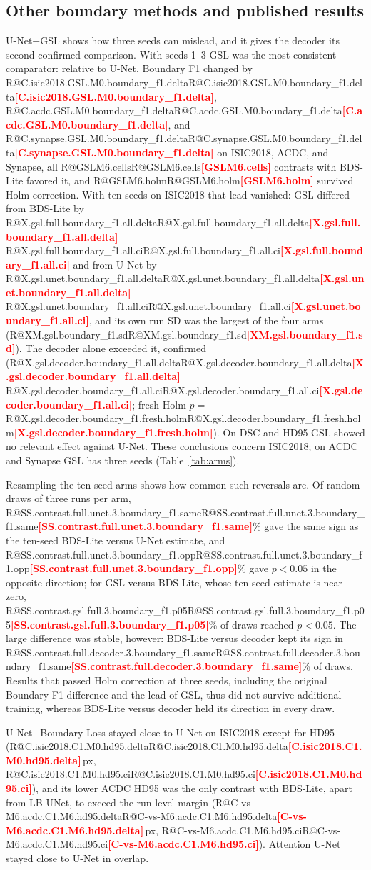\documentclass[fleqn,10pt,lineno]{wlpeerj}
\makeatletter
\newcommand{\R}[1]{\ifcsname R@#1\endcsname\csname R@#1\endcsname\else\textbf{\textcolor{red}{[#1]}}\fi}
\makeatother
\begin{document}
\subsection*{Other boundary methods and published results}
U-Net+GSL shows how three seeds can mislead, and it gives the decoder its second confirmed comparison. With seeds 1--3 GSL was the most consistent comparator: relative to U-Net, Boundary F1 changed by \R{C.isic2018.GSL.M0.boundary_f1.delta}, \R{C.acdc.GSL.M0.boundary_f1.delta}, and \R{C.synapse.GSL.M0.boundary_f1.delta} on ISIC2018, ACDC, and Synapse, all \R{GSLM6.cells} contrasts with BDS-Lite favored it, and \R{GSLM6.holm} survived Holm correction. With ten seeds on ISIC2018 that lead vanished: GSL differed from BDS-Lite by \R{X.gsl.full.boundary_f1.all.delta} \R{X.gsl.full.boundary_f1.all.ci} and from U-Net by \R{X.gsl.unet.boundary_f1.all.delta} \R{X.gsl.unet.boundary_f1.all.ci}, and its own run SD was the largest of the four arms (\R{XM.gsl.boundary_f1.sd}). The decoder alone exceeded it, confirmed (\R{X.gsl.decoder.boundary_f1.all.delta} \R{X.gsl.decoder.boundary_f1.all.ci}; fresh Holm $p=$\,\R{X.gsl.decoder.boundary_f1.fresh.holm}). On DSC and HD95 GSL showed no relevant effect against U-Net. These conclusions concern ISIC2018; on ACDC and Synapse GSL has three seeds (Table~\ref{tab:arms}).

Resampling the ten-seed arms shows how common such reversals are. Of random draws of three runs per arm, \R{SS.contrast.full.unet.3.boundary_f1.same}\% gave the same sign as the ten-seed BDS-Lite versus U-Net estimate, and \R{SS.contrast.full.unet.3.boundary_f1.opp}\% gave $p<0.05$ in the opposite direction; for GSL versus BDS-Lite, whose ten-seed estimate is near zero, \R{SS.contrast.gsl.full.3.boundary_f1.p05}\% of draws reached $p<0.05$. The large difference was stable, however: BDS-Lite versus decoder kept its sign in \R{SS.contrast.full.decoder.3.boundary_f1.same}\% of draws. Results that passed Holm correction at three seeds, including the original Boundary F1 difference and the lead of GSL, thus did not survive additional training, whereas BDS-Lite versus decoder held its direction in every draw.

U-Net+Boundary Loss stayed close to U-Net on ISIC2018 except for HD95 (\R{C.isic2018.C1.M0.hd95.delta}\,px, \R{C.isic2018.C1.M0.hd95.ci}), and its lower ACDC HD95 was the only contrast with BDS-Lite, apart from LB-UNet, to exceed the run-level margin (\R{C-vs-M6.acdc.C1.M6.hd95.delta}\,px, \R{C-vs-M6.acdc.C1.M6.hd95.ci}). Attention U-Net stayed close to U-Net in overlap.
\end{document}
